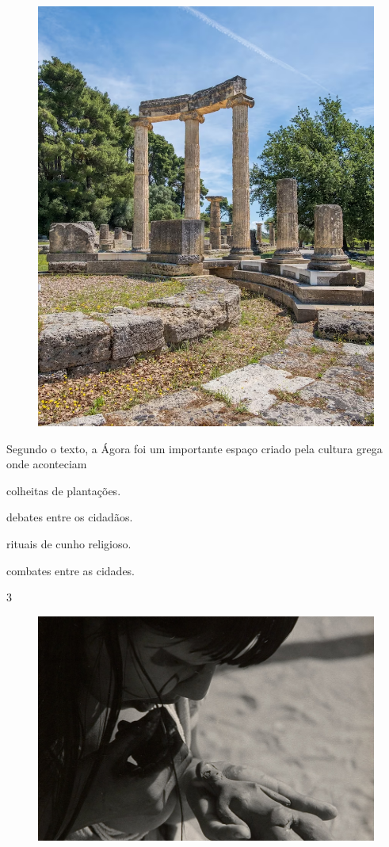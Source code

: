 \begin{figure}[htpb!]
\includegraphics[width=.5\textwidth]{./imgs/img43.png}
\caption{}
\end{figure}

\noindent{}Segundo o texto, a Ágora foi um importante espaço criado pela cultura
grega onde aconteciam

\begin{minipage}{.5\textwidth}
\begin{escolha}
\item colheitas de plantações.

\item debates entre os cidadãos.

\item rituais de cunho religioso.

\item combates entre as cidades.
\end{escolha}
\end{minipage}

\num{3}

\begin{figure}[htpb!]
\includegraphics[width=.5\textwidth]{./imgs/img44.png}
\end{figure}


